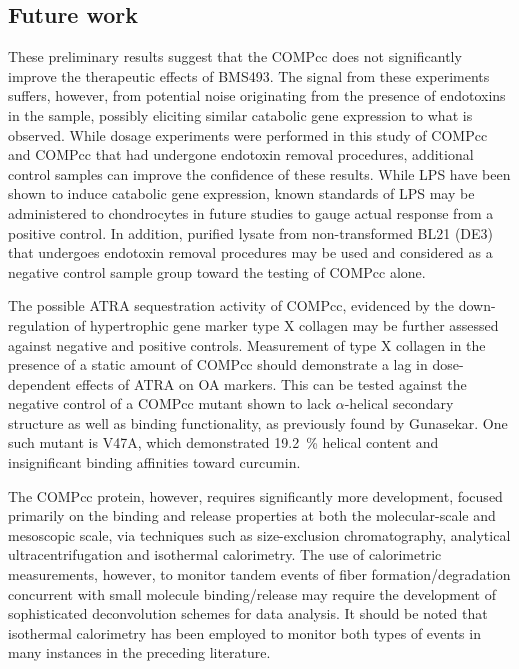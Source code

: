 \begin{refsection}
\subsection{Future work}
\label{sec:future_work_endotoxin}
These preliminary results suggest that the COMPcc does not significantly improve
the therapeutic effects of BMS493. The signal from these experiments suffers,
however, from potential noise originating from the presence of endotoxins in the
sample, possibly eliciting similar catabolic gene expression to what is
observed. While dosage experiments were performed in this study of COMPcc and
COMPcc that had undergone endotoxin removal procedures, additional control
samples can improve the confidence of these results. While LPS have been shown
to induce catabolic gene expression, known standards of LPS may be administered
to chondrocytes in future studies to gauge actual response from a positive
control. In addition, purified lysate from non-transformed BL21 (DE3)
 that undergoes endotoxin removal procedures may be used and
considered as a negative control sample group toward the testing of COMPcc
alone.

\label{sec:future_work_ATRA_sequestration}
The possible ATRA sequestration activity of COMPcc, evidenced by the
down-regulation of hypertrophic gene marker type X collagen may be further
assessed against negative and positive controls. Measurement of type X collagen
in the presence of a static amount of COMPcc should demonstrate a lag in
dose-dependent effects of ATRA on OA markers. This can be tested against the
negative control of a COMPcc mutant shown to lack ${\alpha}$-helical secondary
structure as well as binding functionality, as previously found by
Gunasekar.\cite{Gunasekar2009} One such mutant is V47A, which demonstrated
\SI{19.2}{\percent} helical content and insignificant binding affinities toward
curcumin.\cite{Gunasekar2009}

The COMPcc protein, however, requires significantly more development, focused
primarily on the binding and release properties at both the molecular-scale and
mesoscopic scale, via techniques such as size-exclusion chromatography,
analytical ultracentrifugation and isothermal calorimetry. The use of
calorimetric measurements, however, to monitor tandem events of fiber
formation/degradation concurrent with small molecule binding/release may require
the development of sophisticated deconvolution schemes for data analysis. It
should be noted that isothermal calorimetry has been employed to monitor both
types of events in many instances in the preceding literature.\cite{Kardos2004}


\end{refsection}
